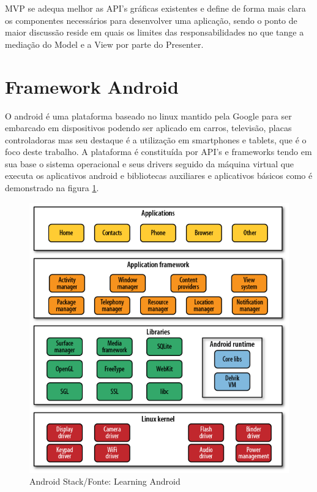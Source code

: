 MVP se adequa melhor as API's gráficas existentes e define de forma mais clara
os componentes necessários para desenvolver uma aplicação, sendo o ponto de maior
discussão reside em quais os limites das responsabilidades no que tange a
mediação do Model e a View por parte do Presenter.



\section{Framework Android}
 

O android é uma plataforma baseado no linux mantido pela Google para
ser embarcado em dispositivos podendo ser aplicado em carros, televisão, placas
controladoras mas seu destaque é a utilização em smartphones e
tablets, que é o foco deste trabalho. A plataforma é constituída por API's e
frameworks tendo em sua base o sistema operacional e seus drivers seguido da
máquina virtual que executa os aplicativos android e bibliotecas auxiliares e
aplicativos básicos como é demonstrado na figura \ref{android_stack}.

\begin{figure}[h]
	\centering
	\includegraphics[scale=0.5]{img/android_stack.png}
	\caption{Android Stack/Fonte: Learning Android}
	\label{android_stack}
\end{figure}

